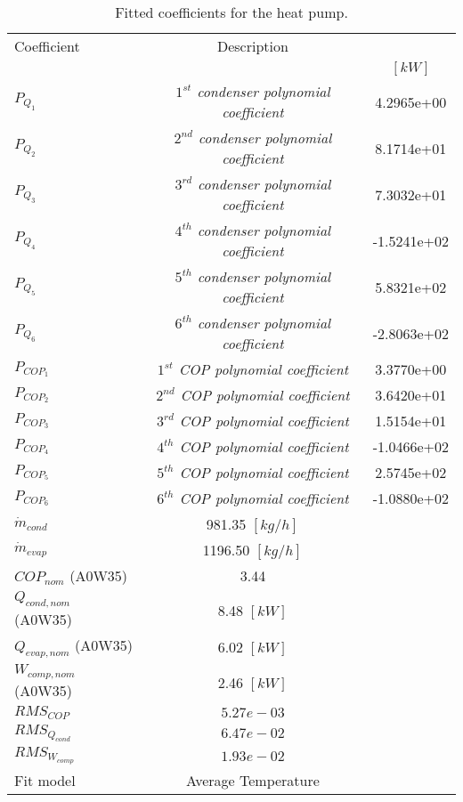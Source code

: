\documentclass[english]{SPFShortReport}
\author{martin.neugebauer}
\begin{document}
\begin{table}[!ht]
\centering
\caption{Fitted coefficients for the heat pump.}
\begin{adjustbox}{max width =\textwidth}
\begin{tabular}{l | c c } 
\hline
\hline
Coefficient &Description & \\ 
 & &$[kW]$\\ 
\hline
$P_{Q_{1}}$ & \emph{$1^{st}$ condenser polynomial coefficient}  & 4.2965e+00    \\ 
$P_{Q_{2}}$ & \emph{$2^{nd}$ condenser polynomial coefficient}  & 8.1714e+01    \\ 
$P_{Q_{3}}$ & \emph{$3^{rd}$ condenser polynomial coefficient}  & 7.3032e+01    \\ 
$P_{Q_{4}}$ & \emph{$4^{th}$ condenser polynomial coefficient}  & -1.5241e+02    \\ 
$P_{Q_{5}}$ & \emph{$5^{th}$ condenser polynomial coefficient}  & 5.8321e+02    \\ 
$P_{Q_{6}}$ & \emph{$6^{th}$ condenser polynomial coefficient}  & -2.8063e+02    \\ 
\hline
$P_{COP_{1}}$ & \emph{$1^{st}$ COP polynomial coefficient}  & 3.3770e+00    \\ 
$P_{COP_{2}}$ & \emph{$2^{nd}$ COP polynomial coefficient}  & 3.6420e+01    \\ 
$P_{COP_{3}}$ & \emph{$3^{rd}$ COP polynomial coefficient}  & 1.5154e+01    \\ 
$P_{COP_{4}}$ & \emph{$4^{th}$ COP polynomial coefficient}  & -1.0466e+02    \\ 
$P_{COP_{5}}$ & \emph{$5^{th}$ COP polynomial coefficient}  & 2.5745e+02    \\ 
$P_{COP_{6}}$ & \emph{$6^{th}$ COP polynomial coefficient}  & -1.0880e+02    \\ 
\hline
$\dot m_{cond}$ & 981.35 $[kg/h]$ \\ 
$\dot m_{evap}$ & 1196.50 $[kg/h]$ \\ 
\hline
$COP_{nom}$ (A0W35)& 3.44 \\ 
$Q_{cond,nom}$ (A0W35)& 8.48 $[kW]$\\ 
$Q_{evap,nom}$ (A0W35)& 6.02 $[kW]$\\ 
$W_{comp,nom}$ (A0W35)& 2.46 $[kW]$\\ 
\hline
 $RMS_{COP}$ & $5.27e-03$ \\ 
 $RMS_{Q_{cond}}$ & $6.47e-02$ \\ 
 $RMS_{W_{comp}}$ & $1.93e-02$ \\ 
\hline
Fit model & Average Temperature\\ 
\hline
\hline
\end{tabular}
\end{adjustbox}
\label{CoefTable}
\end{table}
\end{document}
